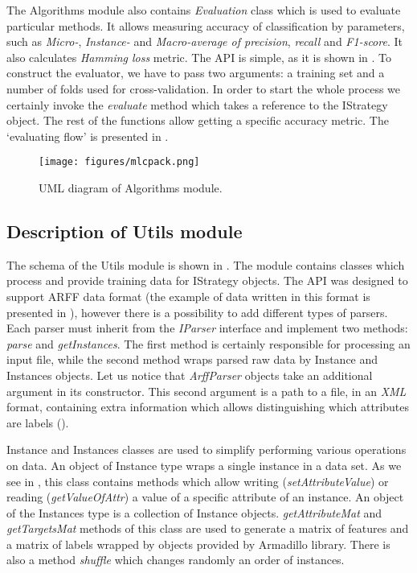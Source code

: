 \documentclass[english,a4paper,twoside]{ppfcmthesis}
\begin{document}
The Algorithms module also contains \textit{Evaluation} class which is used to evaluate particular methods. It allows measuring accuracy of classification by parameters, such as \textit{Micro-}, \textit{Instance-} and \textit{Macro-average of precision}, \textit{recall} and \textit{F1-score}. It also calculates \textit{Hamming loss} metric. The API is simple, as it is shown in . To construct the evaluator, we have to pass two arguments: a training set and a number of folds used for cross-validation. In order to start the whole process we certainly invoke the \textit{evaluate} method which takes a reference to the IStrategy object. The rest of the functions allow getting a specific accuracy metric. The `evaluating flow' is presented in .

\begin{figure}
\centering
\caption{UML diagram of Algorithms module.}
\label{fig:alg_sh}
\texttt{[image: figures/mlcpack.png]}
\end{figure}

\subsection{Description of Utils module}

The schema of the Utils module is shown in . The module contains classes which process and provide training data for IStrategy objects. The API was designed to support ARFF data format (the example of data written in this format is presented in ), however there is a possibility to add different types of parsers. Each parser must inherit from the \textit{IParser} interface and implement two methods: \textit{parse} and \textit{getInstances}. The first method is certainly responsible for processing an input file, while the second method wraps parsed raw data by Instance and Instances objects. Let us notice that \textit{ArffParser} objects take an additional argument in its constructor. This second argument is a path to a file, in an \textit{XML} format, containing extra information which allows distinguishing which attributes are labels ().

Instance and Instances classes are used to simplify performing various operations on data. An object of Instance type wraps a single instance in a data set. As we see in , this class contains methods which allow writing (\textit{setAttributeValue}) or reading (\textit{getValueOfAttr}) a value of a specific attribute of an instance. An object of the Instances type is a collection of Instance objects. \textit{getAttributeMat} and \textit{getTargetsMat} methods of this class are used to generate a matrix of features and a matrix of labels wrapped by objects provided by Armadillo library. There is also a method \textit{shuffle} which changes randomly an order of instances.  
\end{document}
